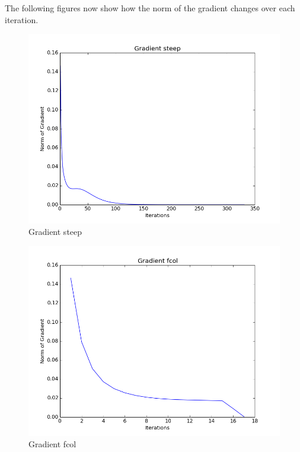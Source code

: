 \documentclass{article}
\begin{document}
The following figures now show how the norm of the gradient changes over each iteration.
\begin{figure}[H]
  \centering
  \includegraphics[scale=0.5]{3steep.png}
  \caption{Gradient steep}
\end{figure}
\begin{figure}[H]
  \centering
  \includegraphics[scale=0.5]{3fcol.png}
  \caption{Gradient fcol}
\end{figure}
\end{document}

